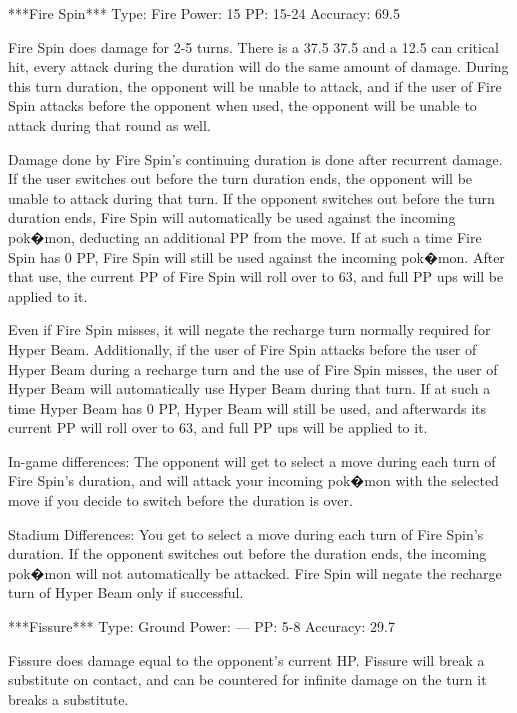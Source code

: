 \documentclass[reprint, aps, prl, paper=A4]{revtex4-1}
\begin{document}
***Fire Spin***
Type: Fire
Power: 15
PP: 15-24
Accuracy: 69.5%

Fire Spin does damage for 2-5 turns. There is a 37.5%
37.5%
and a 12.5%
can critical hit, every attack during the duration will do the same amount of damage. During
this turn duration, the opponent will be unable to attack, and if the user of Fire Spin attacks
before the opponent when used, the opponent will be unable to attack during that round as well.

Damage done by Fire Spin's continuing duration is done after recurrent damage. If the user
switches out before the turn duration ends, the opponent will be unable to attack during that
turn. If the opponent switches out before the turn duration ends, Fire Spin will automatically
be used against the incoming pok�mon, deducting an additional PP from the move. If at such a
time Fire Spin has 0 PP, Fire Spin will still be used against the incoming pok�mon. After that
use, the current PP of Fire Spin will roll over to 63, and full PP ups will be applied to it.

Even if Fire Spin misses, it will negate the recharge turn normally required for Hyper Beam.
Additionally, if the user of Fire Spin attacks before the user of Hyper Beam during a recharge
turn and the use of Fire Spin misses, the user of Hyper Beam will automatically use Hyper Beam
during that turn. If at such a time Hyper Beam has 0 PP, Hyper Beam will still be used, and
afterwards its current PP will roll over to 63, and full PP ups will be applied to it.

In-game differences:
The opponent will get to select a move during each turn of Fire Spin's duration, and will
attack your incoming pok�mon with the selected move if you decide to switch before the duration
is over.

Stadium Differences:
You get to select a move during each turn of Fire Spin's duration. If the opponent switches out
before the duration ends, the incoming pok�mon will not automatically be attacked. Fire Spin
will negate the recharge turn of Hyper Beam only if successful.


***Fissure***
Type: Ground
Power: ---
PP: 5-8
Accuracy: 29.7%

Fissure does damage equal to the opponent's current HP. Fissure will break a substitute
on contact, and can be countered for infinite damage on the turn it breaks a substitute.
\end{document}
